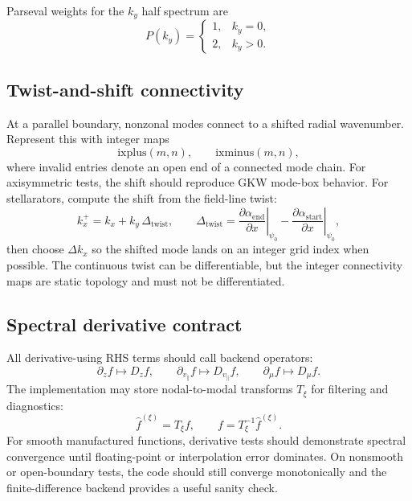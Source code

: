 \documentclass[11pt,a4paper]{article}
\newcommand{\vpar}{v_{\parallel}}
\begin{document}
Parseval weights for the \(k_y\) half spectrum are
\begin{equation}
  P(k_y)=
  \begin{cases}
    1, & k_y=0,\\
    2, & k_y>0.
  \end{cases}
  \label{eq:parseval}
\end{equation}

\subsection{Twist-and-shift connectivity}

At a parallel boundary, nonzonal modes connect to a shifted radial wavenumber.  Represent this with integer maps
\begin{equation}
  \mathrm{ixplus}(m,n),\qquad
  \mathrm{ixminus}(m,n),
  \label{eq:ixmaps}
\end{equation}
where invalid entries denote an open end of a connected mode chain.  For axisymmetric tests, the shift should reproduce GKW mode-box behavior.  For stellarators, compute the shift from the field-line twist:
\begin{equation}
  k_x^{+}
  =
  k_x + k_y\,\Delta_{\mathrm{twist}},
  \qquad
  \Delta_{\mathrm{twist}}
  =
  \left.
  \frac{\partial \alpha_{\mathrm{end}}}{\partial x}
  \right|_{\psi_0}
  -
  \left.
  \frac{\partial \alpha_{\mathrm{start}}}{\partial x}
  \right|_{\psi_0},
  \label{eq:twist-shift-general}
\end{equation}
then choose \(\Delta k_x\) so the shifted mode lands on an integer grid index when possible.  The continuous twist can be differentiable, but the integer connectivity maps are static topology and must not be differentiated.

\subsection{Spectral derivative contract}

All derivative-using RHS terms should call backend operators:
\begin{equation}
  \partial_z f \mapsto D_z f,
  \qquad
  \partial_{\vpar} f \mapsto D_{v_\parallel} f,
  \qquad
  \partial_\mu f \mapsto D_\mu f.
  \label{eq:spectral-derivative-contract}
\end{equation}
The implementation may store nodal-to-modal transforms \(T_\xi\) for filtering and diagnostics:
\begin{equation}
  \widehat f^{(\xi)} = T_\xi f,
  \qquad
  f = T_\xi^{-1}\widehat f^{(\xi)}.
  \label{eq:modal-transform}
\end{equation}
For smooth manufactured functions, derivative tests should demonstrate spectral convergence until floating-point or interpolation error dominates.  On nonsmooth or open-boundary tests, the code should still converge monotonically and the finite-difference backend provides a useful sanity check.
\end{document}
